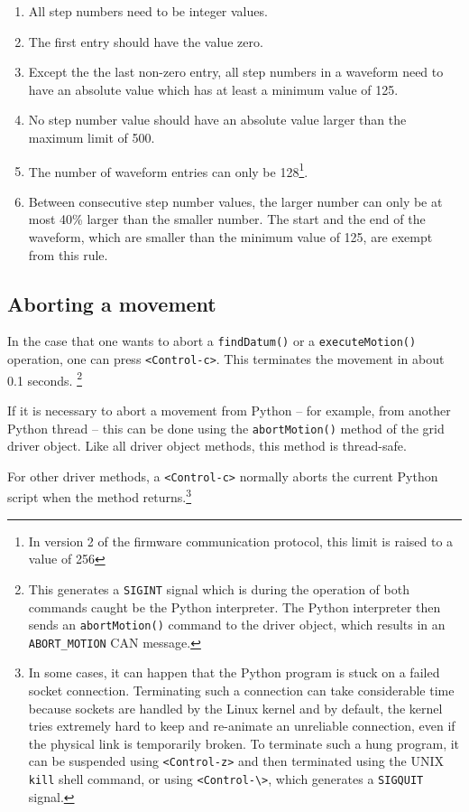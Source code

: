 \documentclass{scrartcl}[12pt,a4paper]
\begin{document}
\begin{enumerate}

\item All step numbers need to be integer values.

\item The first entry should have the value zero.
  
\item Except the the last non-zero entry, all step numbers in a
  waveform need to have an absolute value which has at least a minimum
  value of 125.

\item No step number value should have an absolute value larger than
  the maximum limit of 500.

\item The number of waveform entries can only be 128\footnote{In
  version 2 of the firmware communication protocol, this limit is
  raised to a value of 256}.

\item Between consecutive step number values, the larger number can
  only be at most 40\% larger than the smaller number. The start and
  the end of the waveform, which are smaller than the minimum value of
  125, are exempt from this rule.

  
\end{enumerate}



\subsection{Aborting a movement}

In the case that one wants to abort a \texttt{findDatum()} or a
\texttt{executeMotion()} operation, one can press
\verb+<Control-c>+. This terminates the movement in about 0.1
seconds. \footnote{This generates a \texttt{SIGINT} signal which is
  during the operation of both commands caught be the Python
  interpreter. The Python interpreter then sends an
  \texttt{abortMotion()} command to the driver object, which results
  in an \texttt{ABORT\_MOTION} CAN message.}

If it is necessary to abort a movement from Python -- for example,
from another Python thread -- this can be done using the
\texttt{abortMotion()} method of the grid driver object.  Like all
driver object methods, this method is thread-safe.

For other driver methods, a \verb+<Control-c>+ normally aborts the
current Python script when the method returns.\footnote{In some cases,
  it can happen that the Python program is stuck on a failed socket
  connection. Terminating such a connection can take considerable time
  because sockets are handled by the Linux kernel and by default, the
  kernel tries extremely hard to keep and re-animate an unreliable
  connection, even if the physical link is temporarily broken. To
  terminate such a hung program, it can be suspended using
  \texttt{<Control-z>} and then terminated using the UNIX
  \texttt{kill} shell command, or using
  \texttt{<Control-\textbackslash>}, which generates a
  \texttt{SIGQUIT} signal.}
\end{document}
